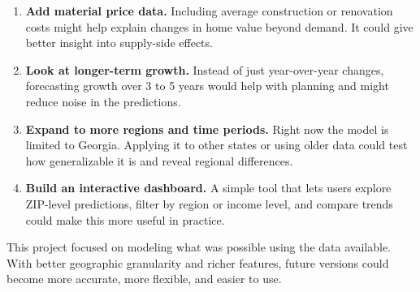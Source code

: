 \begin{enumerate}
    \item \textbf{Add material price data.} Including average construction or renovation costs might help explain changes in home value beyond demand. It could give better insight into supply-side effects.

    \item \textbf{Look at longer-term growth.} Instead of just year-over-year changes, forecasting growth over 3 to 5 years would help with planning and might reduce noise in the predictions.

    \item \textbf{Expand to more regions and time periods.} Right now the model is limited to Georgia. Applying it to other states or using older data could test how generalizable it is and reveal regional differences.

    \item \textbf{Build an interactive dashboard.} A simple tool that lets users explore ZIP-level predictions, filter by region or income level, and compare trends could make this more useful in practice.
\end{enumerate}

This project focused on modeling what was possible using the data available. With better geographic granularity and richer features, future versions could become more accurate, more flexible, and easier to use.

